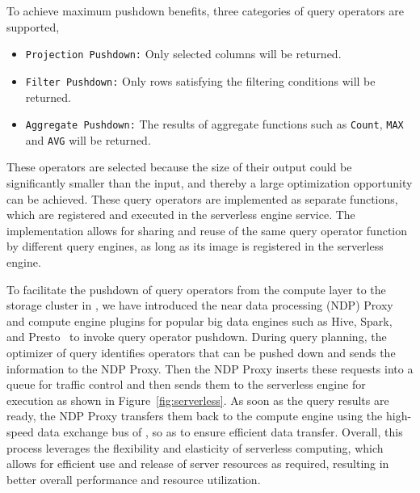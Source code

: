 To achieve maximum pushdown benefits, three categories of query operators are supported, 

\begin{itemize}

\item \texttt{Projection Pushdown:}  Only selected columns will be returned.

\item \texttt{Filter Pushdown:} Only rows satisfying the filtering conditions will be returned.

\item \texttt{Aggregate  Pushdown:} The results of aggregate functions such as \texttt{Count}, \texttt{MAX} and \texttt{AVG} will be returned.

\end{itemize}

These operators are selected because the size of their output could be significantly smaller than the input, and thereby a large optimization opportunity can be achieved.
These query operators are implemented as separate functions, which are registered and executed in the serverless engine service. The implementation allows for sharing and reuse of the same query operator function by different query engines, as long as its image is registered in the serverless engine.



To facilitate the pushdown of query operators from the compute layer to the storage cluster in \sys, we have introduced the near data processing (NDP) Proxy and compute engine plugins for popular big data engines such as Hive, Spark, and Presto~\cite{hive, spark,presto} to invoke query operator  pushdown. 
 During query planning, the optimizer of  query  identifies operators that can be pushed down and sends the information to the NDP Proxy.  Then the NDP Proxy inserts these requests into a queue for traffic control and then sends them to the serverless engine for execution as shown in Figure~\ref{fig:serverless}.
As soon as the query results are ready, the NDP Proxy transfers them back to the compute engine using the high-speed data exchange bus of \sys, so as to ensure efficient data transfer.
Overall,  this process leverages the flexibility and elasticity of serverless computing, which allows for efficient use and release of server resources as required, resulting in better overall performance and resource utilization. 
























